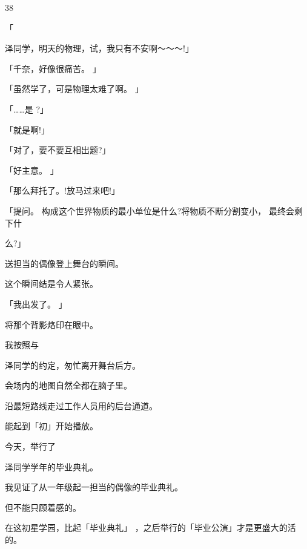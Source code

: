 38\par
「\par
泽同学，明天的物理，试，我只有不安啊～～～!」\par
「千奈，好像很痛苦。 」\par
「虽然学了，可是物理太难了啊。 」\par
「……是 ?」\par
「就是啊!」\par
「对了，要不要互相出题?」\par
「好主意。 」\par
「那么拜托了。!放马过来吧!」\par
「提问。 构成这个世界物质的最小单位是什么?将物质不断分割变小， 最终会剩下什\par
么?」\par
送担当的偶像登上舞台的瞬间。\par
这个瞬间结是令人紧张。\par
「我出发了。 」\par
将那个背影烙印在眼中。\par
我按照与\par
泽同学的约定，匆忙离开舞台后方。\par
会场内的地图自然全都在脑子里。\par
沿最短路线走过工作人员用的后台通道。\par
能起到「初」开始播放。\par
今天，举行了\par
泽同学学年的毕业典礼。\par
我见证了从一年级起一担当的偶像的毕业典礼。\par
但不能只顾着感的。\par
在这初星学园，比起「毕业典礼」 ，之后举行的「毕业公演」才是更盛大的活的。\par

